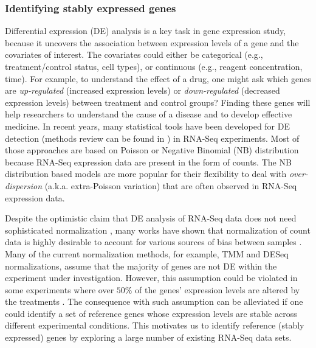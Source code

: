 \subsubsection{Identifying stably expressed genes}
 Differential expression (DE) analysis is a key task in gene expression study, because it uncovers 
 the association between expression levels of a gene and the covariates of interest. The covariates 
could either be categorical (e.g., treatment/control status, cell types), or continuous (e.g., 
reagent concentration, time). For example, to understand the effect of a drug, one might ask which 
genes are \textit{up-regulated} (increased expression levels) or \textit{down-regulated} (decreased 
expression levels) between treatment and control groups? Finding these genes will help researchers 
to understand the cause of a disease and to develop effective medicine. In recent years, many 
statistical tools have  been developed for DE detection (methods review can be found in 
\cite{rapaport2013comprehensive,seyednasrollah2015comparison,soneson2013comparison}) in RNA-Seq 
experiments. Most of those approaches are based on Poisson \citep{marioni2008rna, wang2010degseq}
or Negative Binomial (NB) distribution
\citep{anders2010differential,di2011nbp,oberg2012technical,robinson2007moderated, wu2013new} because
RNA-Seq expression data are present in the form of counts. %
The NB distribution based models are more popular for their flexibility to deal with 
\textit{over-dispersion} (a.k.a. extra-Poisson variation) that are often observed in RNA-Seq 
expression data.



Despite the optimistic claim that DE analysis of RNA-Seq data does not need 
sophisticated normalization \citep{wang2009rna}, many works have shown that normalization of count 
data is highly desirable to account for various sources of bias between samples
\citep{anders2010differential,dillies2013comprehensive,hansen2012removing, risso2014nat,
	risso2011gc,robinson2010scaling}.
Many of the current normalization methods, for example, TMM \citep{robinson2010scaling} and DESeq
\citep{anders2010differential} normalizations, assume that the majority of genes are not DE within
the experiment under investigation. However, this assumption could be violated in some experiments
where over $50\%$ of the genes' expression levels are altered by the treatments
\citep{loven2012revisiting, wu2013use}. The consequence with such assumption can be alleviated if
one could identify a set of reference genes whose expression levels are stable across
different experimental conditions. This motivates us to identify reference (stably expressed) genes 
by exploring a large number of existing RNA-Seq data sets.

